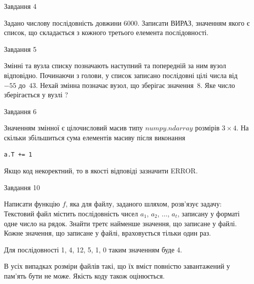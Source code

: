 \documentclass[12pt, ukrainian]{article}
\begin{document}
{               
{\begin{center}Завдання {4}\end{center}}
\vspace{-6mm}

 Задано числову послідовність  довжини 6000. Записати ВИРАЗ, значенням якого є список, що складається з кожного третього елемента послідовності.\par

\vspace{10mm}
               
{\begin{center}Завдання {5}\end{center}}
\vspace{-6mm}
Змінні  та  вузла списку позначають наступний та попередній за ним вузол відповідно. Починаючи з голови, у список записано послідовні цілі числа від~$-55$ до~$43$. Нехай змінна  позначає вузол, що зберігає значення~$8$.
Яке число зберігається у вузлі  ?\par

               
{\begin{center}Завдання {6}\end{center}}
\vspace{-6mm}
Значенням змінної  є цілочисловий масив типу $numpy.ndarray$ розмірів $3{\times}4$. На скільки збільшиться сума елементів масиву  після виконання
\begin{verbatim}
a.T += 1
\end{verbatim}


Якщо код некоректний, то в якості відповіді зазначити ERROR.\par

               
{\begin{center}Завдання {10}\end{center}}
\vspace{-6mm}

Написати функцію $f$, яка для файлу, заданого шляхом, розв’язує задачу:\\ Текстовий файл містить послідовність чисел $a_1$, $a_2$, $\ldots$, $a_t$, записану у форматі одне число на рядок. Знайти третє найменше значення, що записане у файлі. Кожне значення, що записане у файлі, враховується тільки один раз. \par
Для послідовності 1, 4, 12, 5, 1, 0 таким значенням буде 4.

В усіх випадках розміри файлів такі, що їх вміст повністю завантажений у пам'ять бути не може. Якість коду також оцінюється.



}
\end{document}
